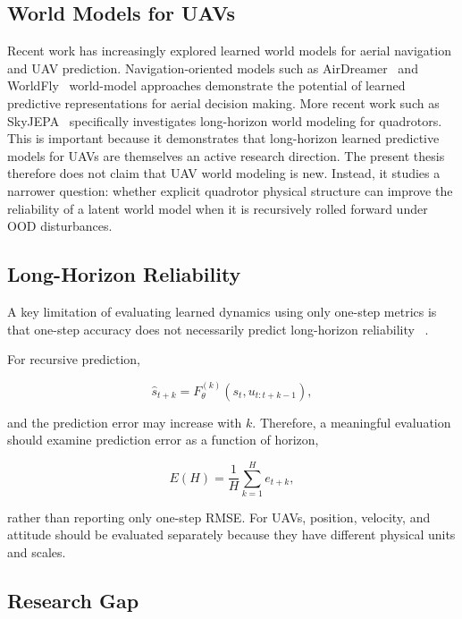 \documentclass[conference]{IEEEtran}
\begin{document}
\subsection{World Models for UAVs}

Recent work has increasingly explored learned world models for aerial navigation and UAV prediction. Navigation-oriented models such as AirDreamer~\cite{liu2026airdreamer} and WorldFly~\cite{zheng2026worldfly} world-model approaches demonstrate the potential of learned predictive representations for aerial decision making. More recent work such as SkyJEPA~\cite{skyjepa2026} specifically
investigates long-horizon world modeling for quadrotors. This is
important because it demonstrates that long-horizon learned predictive
models for UAVs are themselves an active research direction. The present thesis therefore does not claim that UAV world modeling is
new. Instead, it studies a narrower question: whether explicit
quadrotor physical structure can improve the reliability of a latent
world model when it is recursively rolled forward under OOD
disturbances.


\subsection{Long-Horizon Reliability}

A key limitation of evaluating learned dynamics using only one-step metrics is that one-step accuracy does not necessarily predict long-horizon reliability ~\cite{zidan2026worldmodels}.

For recursive prediction,

\begin{equation}
\hat{s}_{t+k}
=
F_{\theta}^{(k)}(s_t,u_{t:t+k-1}),
\end{equation}

and the prediction error may increase with $k$. Therefore, a meaningful evaluation should examine prediction error as a function of horizon,

\begin{equation}
E(H)
=
\frac{1}{H}
\sum_{k=1}^{H}
e_{t+k},
\end{equation}

rather than reporting only one-step RMSE. For UAVs, position, velocity, and attitude should be evaluated
separately because they have different physical units and scales.


\subsection{Research Gap}
\end{document}
